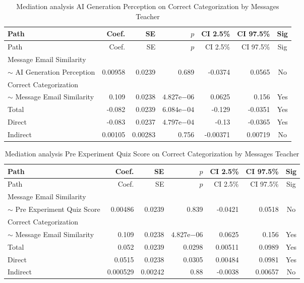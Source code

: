 \begin{longtable}{lrrrrrc}
            \caption{Mediation analysis AI Generation Perception on Correct Categorization by  Messages Teacher}\label{tab:mediation AI Generation Perception on Correct Categorization by  Messages Teacher}\\
            \toprule
            Path & Coef. & SE & $p$ & CI 2.5\% & CI 97.5\% & Sig \\
            \midrule
            \endfirsthead
            \toprule
            Path & Coef. & SE & $p$ & CI 2.5\% & CI 97.5\% & Sig \\
            \midrule
            \endhead
            \bottomrule
            \endfoot
            Message Email Similarity\\ $\sim$ AI Generation Perception & 0.00958 & 0.0239 & 0.689 & -0.0374 & 0.0565 & No \\
Correct Categorization\\ $\sim$ Message Email Similarity & 0.109 & 0.0238 & $4.827\mathrm{e}{-06}$ & 0.0625 & 0.156 & Yes \\
Total & -0.082 & 0.0239 & $6.084\mathrm{e}{-04}$ & -0.129 & -0.0351 & Yes \\
Direct & -0.083 & 0.0237 & $4.797\mathrm{e}{-04}$ & -0.13 & -0.0365 & Yes \\
Indirect & 0.00105 & 0.00283 & 0.756 & -0.00371 & 0.00719 & No \\
\end{longtable}

\begin{longtable}{lrrrrrc}
            \caption{Mediation analysis Pre Experiment Quiz Score on Correct Categorization by  Messages Teacher}\label{tab:mediation Pre Experiment Quiz Score on Correct Categorization by  Messages Teacher}\\
            \toprule
            Path & Coef. & SE & $p$ & CI 2.5\% & CI 97.5\% & Sig \\
            \midrule
            \endfirsthead
            \toprule
            Path & Coef. & SE & $p$ & CI 2.5\% & CI 97.5\% & Sig \\
            \midrule
            \endhead
            \bottomrule
            \endfoot
            Message Email Similarity\\ $\sim$ Pre Experiment Quiz Score & 0.00486 & 0.0239 & 0.839 & -0.0421 & 0.0518 & No \\
Correct Categorization\\ $\sim$ Message Email Similarity & 0.109 & 0.0238 & $4.827\mathrm{e}{-06}$ & 0.0625 & 0.156 & Yes \\
Total & 0.052 & 0.0239 & 0.0298 & 0.00511 & 0.0989 & Yes \\
Direct & 0.0515 & 0.0238 & 0.0305 & 0.00484 & 0.0981 & Yes \\
Indirect & 0.000529 & 0.00242 & 0.88 & -0.0038 & 0.00657 & No \\
\end{longtable}

